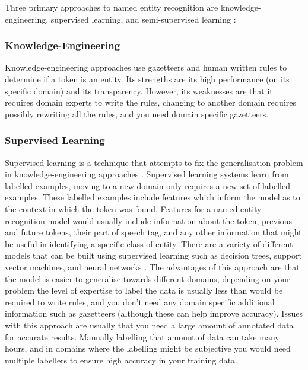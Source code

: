 \documentclass[11pt,oneside]{book}
\begin{document}
Three primary approaches to named entity recognition are knowledge-engineering, supervised learning, and semi-supervised learning \citep{text_processing_lecture_5}:

\subsubsection{Knowledge-Engineering}

Knowledge-engineering approaches use gazetteers and human written rules to determine if a token is an entity. Its strengths are its high performance (on its specific domain) and its transparency. However, its weaknesses are that it requires domain experts to write the rules, changing to another domain requires possibly rewriting all the rules, and you need domain specific gazetteers.

\subsubsection{Supervised Learning}

Supervised learning is a technique that attempts to fix the generalisation problem in knowledge-engineering approaches \citep{what_is_supervised}. Supervised learning systems learn from labelled examples, moving to a new domain only requires a new set of labelled examples. These labelled examples include features which inform the model as to the context in which the token was found. Features for a named entity recognition model would usually include information about the token, previous and future tokens, their part of speech tag, and any other information that might be useful in identifying a specific class of entity. There are a variety of different models that can be built using supervised learning such as decision trees, support vector machines, and neural networks \citep{different_supervised}. The advantages of this approach are that the model is easier to generalise towards different domains, depending on your problem the level of expertise to label the data is usually less than would be required to write rules, and you don’t need any domain specific additional information such as gazetteers (although these can help improve accuracy). Issues with this approach are usually that you need a large amount of annotated data for accurate results. Manually labelling that amount of data can take many hours, and in domains where the labelling might be subjective you would need multiple labellers to ensure high accuracy in your training data.
\end{document}
